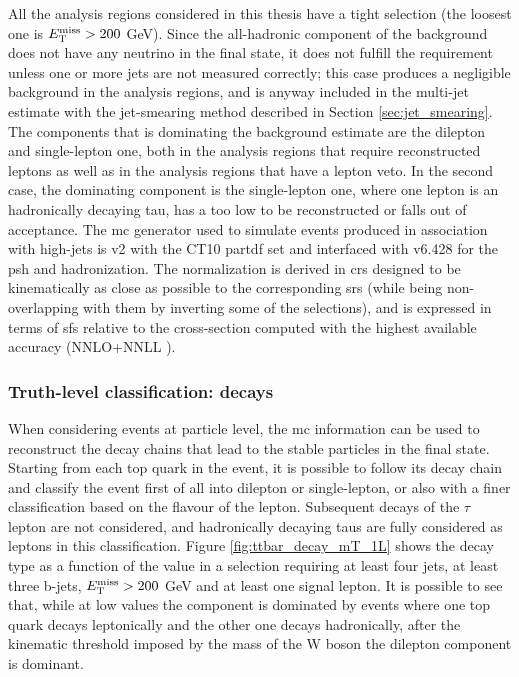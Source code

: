All the analysis regions considered in this thesis have a tight \met selection (the loosest one is $E_{\rm T}^{\mathrm{miss}} > 200$ GeV). Since the all-hadronic component 
of the \ttbar background does not have any neutrino in the final state, it does not fulfill the \met requirement unless one or more jets are not measured correctly; this case produces a negligible background in the analysis regions, and is anyway included in the multi-jet estimate with the jet-smearing method described in Section \ref{sec:jet_smearing}.
The \ttbar components that is dominating the background estimate are the dilepton and single-lepton one, both in the analysis regions that require reconstructed leptons as well as in the analysis regions that have a lepton veto.
In the second case, the dominating component is the single-lepton one, where one lepton is an hadronically decaying tau, has a \pt too low to be reconstructed or falls out of acceptance. 
The \gls{mc} generator used to simulate \ttbar events produced in association with high-\pt jets is \PowhegBox v2 with the CT10 \gls{partdf} set \cite{Lai:2010vv} and interfaced with \PY v6.428 \cite{Sjostrand:2006za} for the \gls{psh} and hadronization. 
The normalization is derived in \glspl{cr} designed to be kinematically as close as possible to the corresponding \glspl{sr} (while being non-overlapping with them by inverting some of the selections), and is expressed in terms of \glspl{sf} relative to the cross-section computed with the highest
available accuracy (NNLO+NNLL \cite{Czakon:2011xx}).

\subsubsection*{Truth-level classification: \ttbar decays}

When considering events at particle level,
the \gls{mc} information can be used to reconstruct the decay chains that lead to the stable particles in the final state. 
Starting from each top quark in the event, it is possible to follow its decay chain and classify the event first of all into dilepton or single-lepton, or also with a finer classification based on the flavour of the lepton. 
Subsequent decays of the $\tau$ lepton are not considered, and hadronically decaying taus are fully considered as leptons in this classification. 
Figure \ref{fig:ttbar_decay_mT_1L} shows the \ttbar decay type as a function of the \mt value  in a selection requiring at least four jets, at least three b-jets, $E_{\rm T}^{\mathrm{miss}}>200$ GeV and at least one signal lepton. It is possible to see that, while at low \mt values the \ttbar component is dominated by events where one top quark decays leptonically and the other one decays hadronically, after the kinematic threshold imposed by the mass of the W boson the dilepton component is dominant. 

